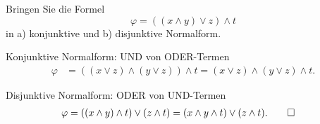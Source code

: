 Bringen Sie die Formel
\[
\varphi
=
((x\wedge y) \vee z) \wedge t
\]
in a) konjunktive und b) disjunktive Normalform.

\begin{loesung}
\begin{teilaufgaben}
\item Konjunktive Normalform: UND von ODER-Termen
\begin{align*}
\varphi
&=
((x\vee z)\wedge (y\vee z)) \wedge t
=
(x\vee z) \wedge (y\vee z) \wedge t.
\end{align*}
\item Disjunktive Normalform: ODER von UND-Termen
\begin{align*}
\varphi
&=
((x\wedge y)\wedge t)\vee(z\wedge t)
=
(x\wedge y \wedge t) \vee (z\wedge t).
\qedhere
\end{align*}
\end{teilaufgaben}
\end{loesung}
